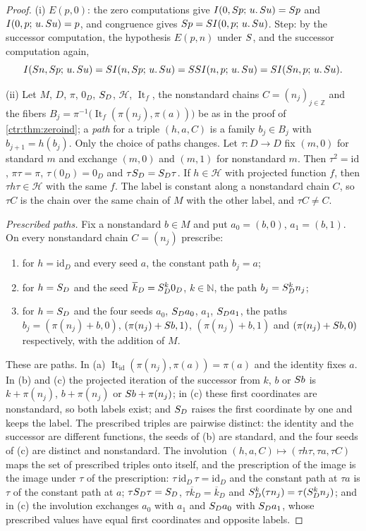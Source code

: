 \begin{proof}
(i) $E(p,0)$: the zero computations give $I(0,S p;\,u.\,S u)=S p$
and $I(0,p;\,u.\,S u)=p$, and congruence gives $S p=SI(0,p;\,u.\,S u)$.
Step: by the successor computation, the hypothesis $E(p,n)$ under $S$, and
the successor computation again,
\[
I(S n,S p;\,u.\,S u)=SI(n,S p;\,u.\,S u)
=SSI(n,p;\,u.\,S u)=SI(S n,p;\,u.\,S u).
\]

(ii) Let $M$, $D$, $\pi$, $0_D$, $S_D$, $\mathscr{H}$, $\operatorname{It}_f$,
the nonstandard chains $C=(n_j)_{j\in\mathbb{Z}}$ and the fibers
$B_j=\pi^{-1}\bigl(\operatorname{It}_f(\pi(n_j),\pi(a))\bigr)$ be as in the
proof of \cref{ctr:thm:zeroind}; a \emph{path} for a triple $(h,a,C)$ is a
family $b_j\in B_j$ with $b_{j+1}=h(b_j)$. Only the choice of paths changes.
Let $\tau\colon D\to D$ fix $(m,0)$ for standard $m$ and exchange $(m,0)$ and
$(m,1)$ for nonstandard $m$. Then $\tau^{2}=\mathrm{id}$, $\pi\tau=\pi$,
$\tau(0_D)=0_D$ and $\tau S_D=S_D\tau$. If $h\in\mathscr{H}$ with
projected function $f$, then $\tau h\tau\in\mathscr{H}$ with the same $f$.
The label is constant along a nonstandard chain $C$, so $\tau C$ is the chain
over the same chain of $M$ with the other label, and $\tau C\ne C$.

\emph{Prescribed paths.} Fix a nonstandard $b\in M$ and put $a_0=(b,0)$,
$a_1=(b,1)$. On every nonstandard chain $C=(n_j)$ prescribe:
\begin{enumerate}[label=(\alph*)]
\item for $h=\mathrm{id}_D$ and every seed $a$, the constant path $b_j=a$;
\item for $h=S_D$ and the seed $\overline{k}_D=S_D^{k}0_D$, $k\in\mathbb{N}$,
the path $b_j=S_D^{k}n_j$;
\item for $h=S_D$ and the four seeds $a_0$, $S_Da_0$, $a_1$, $S_Da_1$,
the paths $b_j=(\pi(n_j)+b,0)$, $(\pi(n_j)+S b,1)$, $(\pi(n_j)+b,1)$ and
$(\pi(n_j)+S b,0)$ respectively, with the addition of $M$.
\end{enumerate}
These are paths. In (a) $\operatorname{It}_{\mathrm{id}}(\pi(n_j),\pi(a))=\pi(a)$
and the identity fixes $a$. In (b) and (c) the projected iteration of the
successor from $k$, $b$ or $S b$ is $k+\pi(n_j)$, $b+\pi(n_j)$ or
$S b+\pi(n_j)$; in (c) these first coordinates are nonstandard, so both
labels exist; and $S_D$ raises the first coordinate by one and keeps the
label. The prescribed triples are pairwise distinct: the identity and the
successor are different functions, the seeds of (b) are standard, and the four
seeds of (c) are distinct and nonstandard. The involution
$(h,a,C)\mapsto(\tau h\tau,\tau a,\tau C)$ maps the set of prescribed triples
onto itself, and the prescription of the image is the image under $\tau$ of
the prescription: $\tau\,\mathrm{id}_D\,\tau=\mathrm{id}_D$ and the constant
path at $\tau a$ is $\tau$ of the constant path at $a$;
$\tau S_D\tau=S_D$, $\tau\overline{k}_D=\overline{k}_D$ and
$S_D^{k}(\tau n_j)=\tau(S_D^{k}n_j)$; and in (c) the involution
exchanges $a_0$ with $a_1$ and $S_Da_0$ with $S_Da_1$, whose prescribed
values have equal first coordinates and opposite labels.


\end{proof}
